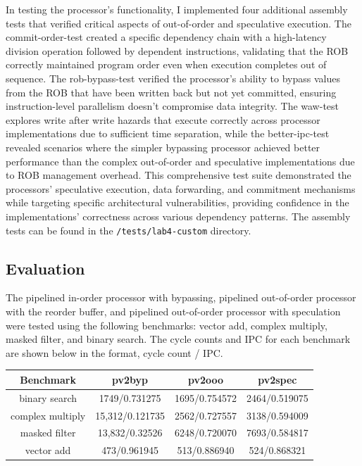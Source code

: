\documentclass[11pt]{article}
\begin{document}
In testing the processor's functionality, I implemented four additional assembly tests that
  verified critical aspects of out-of-order and speculative execution. The
   commit-order-test created a specific dependency chain with a high-latency division operation
  followed by dependent instructions, validating that the ROB correctly maintained program order
  even when execution completes out of sequence. The rob-bypass-test verified the
  processor's ability to bypass values from the ROB that have been written back but not yet
  committed, ensuring instruction-level parallelism doesn't compromise data integrity. 
  The waw-test explores write after write hazards that execute correctly across processor
  implementations due to sufficient time separation, while the better-ipc-test revealed scenarios
  where the simpler bypassing processor achieved better performance than the complex out-of-order and speculative 
  implementations due to ROB management overhead. This comprehensive test suite demonstrated  
  the processors' speculative execution, data forwarding, and commitment mechanisms while targeting
  specific architectural vulnerabilities, providing confidence in the implementations'
  correctness across various dependency patterns. The assembly tests can
  be found in the \texttt{/tests/lab4-custom} directory.


\subsection*{Evaluation}

The pipelined in-order processor with bypassing, pipelined out-of-order processor with the reorder buffer, 
and pipelined out-of-order processor with speculation were tested using the following
benchmarks: vector add, complex multiply, masked filter, and binary search. The
cycle counts and IPC for each benchmark are shown below in the format, cycle
count / IPC.

\begin{center}
    \begin{tabular}{|c || c | c | c|} 
 \hline
 Benchmark & pv2byp & pv2ooo & pv2spec \\
 \hline
 \hline
 binary search & 1749/0.731275 & 1695/0.754572 & 2464/0.519075 \\
 \hline
 complex multiply & 15,312/0.121735 &  2562/0.727557 & 3138/0.594009 \\
 \hline
 masked filter & 13,832/0.32526 & 6248/0.720070 & 7693/0.584817 \\
 \hline
 vector add & 473/0.961945 & 513/0.886940 & 524/0.868321 \\
 \hline

\end{tabular}
\end{center}
\end{document}
